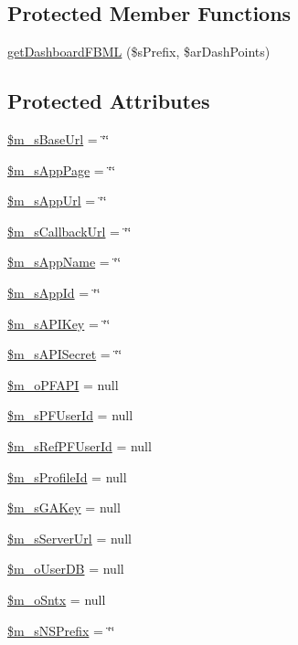 \subsection*{Protected Member Functions}
\begin{DoxyCompactItemize}
\item 
\hyperlink{classSF__Platform_a77e104305f68123aaf2000ff886331d8}{getDashboardFBML} (\$sPrefix, \$arDashPoints)
\end{DoxyCompactItemize}
\subsection*{Protected Attributes}
\begin{DoxyCompactItemize}
\item 
\hyperlink{classSF__Platform_a12f1f6a87e26bffa94c2b7e5ea3885c9}{\$m\_\-sBaseUrl} = \char`\"{}\char`\"{}
\item 
\hyperlink{classSF__Platform_ae9ca918bbe92c641557f1ee16a082100}{\$m\_\-sAppPage} = \char`\"{}\char`\"{}
\item 
\hyperlink{classSF__Platform_ab35950231d123d9279d8b0b3b0878609}{\$m\_\-sAppUrl} = \char`\"{}\char`\"{}
\item 
\hyperlink{classSF__Platform_a5c010b1e93c651cf5024339d568fb0d1}{\$m\_\-sCallbackUrl} = \char`\"{}\char`\"{}
\item 
\hyperlink{classSF__Platform_a349b224844e6202ccda4da1605f5156b}{\$m\_\-sAppName} = \char`\"{}\char`\"{}
\item 
\hyperlink{classSF__Platform_acd79de47be3cc9eb08fa4190b5d8a8bb}{\$m\_\-sAppId} = \char`\"{}\char`\"{}
\item 
\hyperlink{classSF__Platform_a47530e961351765a665c4ba63e72ff3d}{\$m\_\-sAPIKey} = \char`\"{}\char`\"{}
\item 
\hyperlink{classSF__Platform_ad25b743c1731f4d58b617a193538c2b0}{\$m\_\-sAPISecret} = \char`\"{}\char`\"{}
\item 
\hyperlink{classSF__Platform_a23d5b5190ee32c4eb8fff028844b1fa6}{\$m\_\-oPFAPI} = null
\item 
\hyperlink{classSF__Platform_aca2665de105ba9e1a89b58722bd21f16}{\$m\_\-sPFUserId} = null
\item 
\hyperlink{classSF__Platform_ae91a01f7cb3d6446617f9e6cae69533c}{\$m\_\-sRefPFUserId} = null
\item 
\hyperlink{classSF__Platform_a935f137fe74f4707be2d81593c3a624d}{\$m\_\-sProfileId} = null
\item 
\hyperlink{classSF__Platform_a450e8067b60f9369bc4370c74ea0f862}{\$m\_\-sGAKey} = null
\item 
\hyperlink{classSF__Platform_af011645fea7e741d5cffcbe968799d90}{\$m\_\-sServerUrl} = null
\item 
\hyperlink{classSF__Platform_a480a834e33015cc9a001d1d84972bb12}{\$m\_\-oUserDB} = null
\item 
\hyperlink{classSF__Platform_a22d1091f94c58e3533304abe3eb9e9fe}{\$m\_\-oSntx} = null
\item 
\hyperlink{classSF__Platform_afe554572420154a2cf6d9ab5049abe55}{\$m\_\-sNSPrefix} = \char`\"{}\char`\"{}
\end{DoxyCompactItemize}


